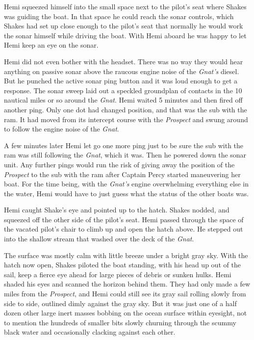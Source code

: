 \documentclass[]{scrbook}
\begin{document}
Hemi squeezed himself into the small space next to the pilot's seat
where Shakes was guiding the boat. In that space he could reach the
sonar controls, which Shakes had set up close enough to the pilot's seat
that normally he would work the sonar himself while driving the boat.
With Hemi aboard he was happy to let Hemi keep an eye on the sonar.

Hemi did not even bother with the headset. There was no way they would
hear anything on passive sonar above the raucous engine noise of the
\emph{Gnat's} diesel. But he punched the active sonar ping button and it
was loud enough to get a response. The sonar sweep laid out a speckled
groundplan of contacts in the 10 nautical miles or so around the
\emph{Gnat}. Hemi waited 5 minutes and then fired off another ping. Only
one dot had changed position, and that was the sub with the ram. It had
moved from its intercept course with the \emph{Prospect} and swung
around to follow the engine noise of the \emph{Gnat}.

A few minutes later Hemi let go one more ping just to be sure the sub
with the ram was still following the \emph{Gnat}, which it was. Then he
powered down the sonar unit. Any further pings would run the risk of
giving away the position of the \emph{Prospect} to the sub with the ram
after Captain Percy started maneuvering her boat. For the time being,
with the \emph{Gnat's} engine overwhelming everything else in the water,
Hemi would have to just guess what the status of the other boats was.

Hemi caught Shake's eye and pointed up to the hatch. Shakes nodded, and
squeezed off the other side of the pilot's seat. Hemi passed through the
space of the vacated pilot's chair to climb up and open the hatch above.
He stepped out into the shallow stream that washed over the deck of the
\emph{Gnat}.

The surface was mostly calm with little breeze under a bright gray sky.
With the hatch now open, Shakes piloted the boat standing, with his head
up out of the sail, keep a fierce eye ahead for large pieces of debris
or sunken hulks. Hemi shaded his eyes and scanned the horizon behind
them. They had only made a few miles from the \emph{Prospect}, and Hemi
could still see its gray sail rolling slowly from side to side, outlined
dimly against the gray sky. But it was just one of a half dozen other
large inert masses bobbing on the ocean surface within eyesight, not to
mention the hundreds of smaller bits slowly churning through the scummy
black water and occasionally clacking against each other.
\end{document}
